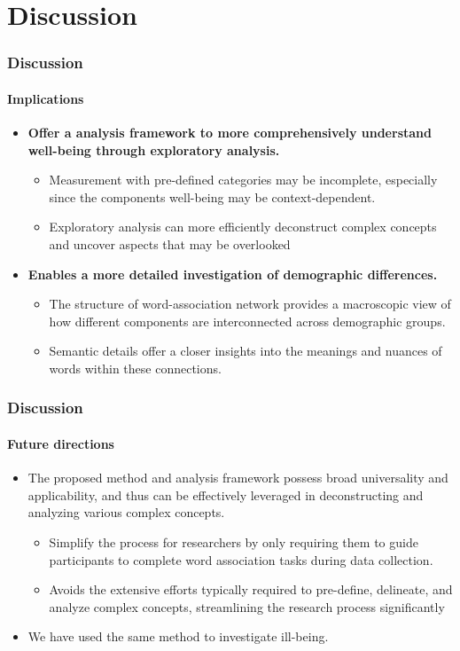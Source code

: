 \documentclass[
	aspectratio=169, %
	t, %
	onlytextwidth, %
	10pt, %
]{beamer}
\begin{document}
\section{Discussion}
\begin{frame}
	\frametitle{Discussion}
        \framesubtitle{Implications}
        \begin{itemize}
            \item \textbf{Offer a analysis framework to more comprehensively understand well-being through exploratory analysis.}
            \begin{itemize}
                \item Measurement with pre-defined categories may be incomplete, especially since the components well-being may be context-dependent.
                \item Exploratory analysis can more efficiently deconstruct complex concepts and uncover aspects that may be overlooked
            \end{itemize}
            \pause
            \item \textbf{Enables a more detailed investigation of demographic differences.}
            \begin{itemize}
                \item The structure of word-association network provides a macroscopic view of how different components are interconnected across demographic groups.
                \item Semantic details offer a closer insights into the meanings and nuances of words within these connections.
            \end{itemize}
        \end{itemize}
\end{frame}


\begin{frame}
	\frametitle{Discussion}
        \framesubtitle{Future directions}
        \begin{itemize}
            \item The proposed method and analysis framework possess broad universality and applicability, and thus can be effectively leveraged in deconstructing and analyzing various complex concepts.
            \begin{itemize}
                \item Simplify the process for researchers by only requiring them to guide participants to complete word association tasks during data collection.
                \item Avoids the extensive efforts typically required to pre-define, delineate, and analyze complex concepts, streamlining the research process significantly
            \end{itemize}
            \item We have used the same method to investigate ill-being.
        \end{itemize}
\end{frame}
\end{document}
